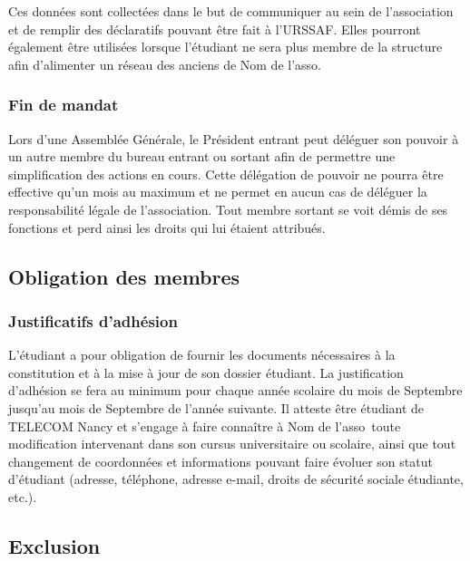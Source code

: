 \documentclass[12pt]{article}
\newcommand{\asso}{Nom de l'asso}
\begin{document}
Ces données sont collectées dans le but de communiquer au sein de l’association et de remplir des déclaratifs
pouvant être fait à l’URSSAF. Elles pourront également être utilisées lorsque l’étudiant ne sera plus membre
de la structure afin d’alimenter un réseau des anciens de \asso.

\subsubsection{Fin de mandat}
\label{sec:membres:droit:fin_mandat}


Lors d’une Assemblée Générale, le Président entrant peut déléguer son pouvoir à un autre membre du bureau
entrant ou sortant afin de permettre une simplification des actions en cours. Cette délégation de pouvoir ne
pourra être effective qu’un mois au maximum et ne permet en aucun cas de déléguer la responsabilité légale
de l’association.
Tout membre sortant se voit démis de ses fonctions et perd ainsi les droits qui lui étaient attribués.

\subsection{Obligation des membres}
\label{sec:membres:obligation}

\subsubsection{Justificatifs d’adhésion}
\label{sec:membres:obligation:justificatif}

L’étudiant a pour obligation de fournir les documents nécessaires à la constitution et à la mise à jour de son
dossier étudiant. La justification d’adhésion se fera au minimum pour chaque année scolaire du mois de
Septembre jusqu’au mois de Septembre de l’année suivante. Il atteste être étudiant de TELECOM Nancy et
s’engage à faire connaître à \asso~toute modification intervenant dans son cursus universitaire ou
scolaire, ainsi que tout changement de coordonnées et informations pouvant faire évoluer son statut
d’étudiant (adresse, téléphone, adresse e-mail, droits de sécurité sociale étudiante, etc.).

\subsection{Exclusion}
\label{sec:membres:exclusion}
\end{document}
